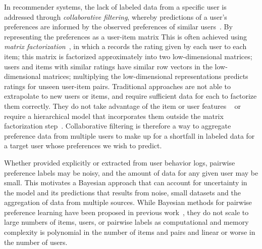 In recommender systems, the lack of labeled data from a specific user is addressed through \emph{collaborative filtering}, whereby predictions of a user's preferences are
informed by the observed preferences of similar users~\citep{?}.
By representing the preferences as a user-item matrix
This is often achieved using \emph{matrix factorization}~\cite{?},
in which a  records the rating given by each user to each item; 
this matrix is factorized approximately into two low-dimensional matrices;
users and items with similar ratings have similar row vectors in the low-dimensional
matrices; 
multiplying the low-dimensional representations predicts ratings for unseen
user-item pairs. 
Traditional approaches are not able to extrapolate to new users or items,
and require sufficient data for each to factorize them correctly. They do not take advantage of the item or user features
~\cite{?} or require a hierarchical model that incorporates them outside the matrix factorization step~\cite{?}. 
Collaborative filtering is therefore a way to aggregate preference data from multiple users to make up for a shortfall in labeled data for a target user whose preferences we 
wish to predict.

Whether provided explicitly or extracted from user behavior logs,
pairwise preference labels may be noisy, and the amount of 
data for any given user may be small.
This motivates a Bayesian approach that can account for uncertainty in the model 
and its predictions that results from noise, 
small datasets and the aggregation of data from multiple sources.
While Bayesian methods for pairwise preference learning have been proposed
in previous work~\cite{chu2009preference,houlsby2012collaborative,khan2014scalable}, they do not scale to large numbers of items, users, or
pairwise labels as computational and memory complexity is polynomial in the number
of items and pairs and linear or worse in the number of users.




